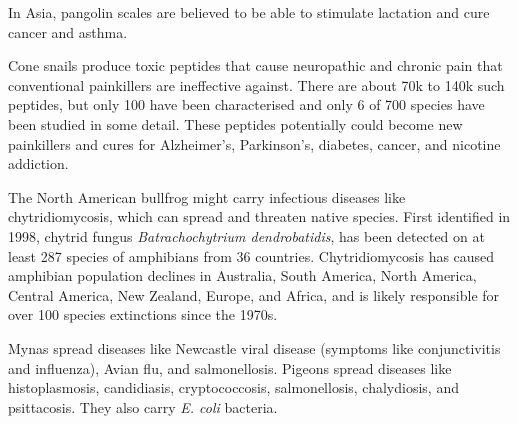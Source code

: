 \documentclass{slnotes}
\newcommand{\scn}[1]{\textit{#1}}
\begin{document}
In Asia, pangolin scales are believed to be able to stimulate lactation and cure cancer and asthma.

Cone snails produce toxic peptides that cause neuropathic and chronic pain that conventional painkillers are ineffective against. There are about 70k to 140k such peptides, but only 100 have been characterised and only 6 of 700 species have been studied in some detail. These peptides potentially could become new painkillers and cures for Alzheimer's, Parkinson's, diabetes, cancer, and nicotine addiction.

The North American bullfrog might carry infectious diseases like chytridiomycosis, which can spread and threaten native species. First identified in 1998, chytrid fungus \scn{Batrachochytrium dendrobatidis}, has been detected on at least 287 species of amphibians from 36 countries. Chytridiomycosis has caused amphibian population declines in Australia, South America, North America, Central America, New Zealand, Europe, and Africa, and is likely responsible for over 100 species extinctions since the 1970s.

Mynas spread diseases like Newcastle viral disease (symptoms like conjunctivitis and influenza), Avian flu, and salmonellosis. Pigeons spread diseases like histoplasmosis, candidiasis, cryptococcosis, salmonellosis, chalydiosis, and psittacosis. They also carry \scn{E. coli} bacteria.
\end{document}

